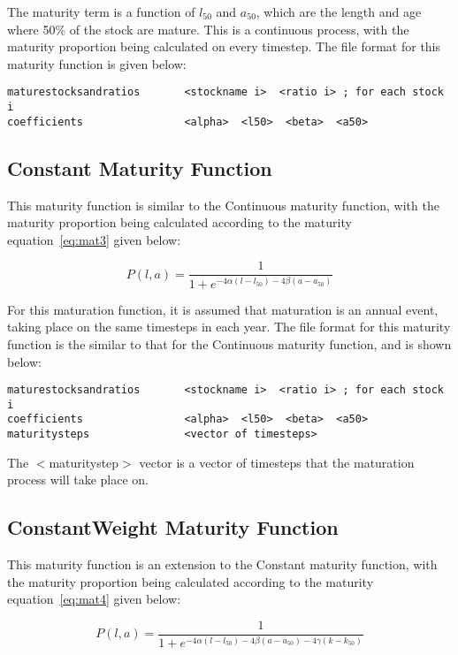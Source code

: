\documentclass[10pt,twoside]{book}
\begin{document}
\bigskip
The maturity term is a function of $l_{50}$ and $a_{50}$, which are the length and age where 50\% of the stock are mature.  This is a continuous process, with the maturity proportion being calculated on every timestep.  The file format for this maturity function is given below:

{\small\begin{verbatim}
maturestocksandratios       <stockname i>  <ratio i> ; for each stock i
coefficients                <alpha>  <l50>  <beta>  <a50>
\end{verbatim}}

\subsection{Constant Maturity Function}
This maturity function is similar to the Continuous maturity function, with the maturity proportion being calculated according to the maturity equation~\ref{eq:mat3} given below:

\begin{equation}\label{eq:mat3}
P(l, a) = \frac{1}{ 1 + e^{-4\alpha(l - l_{50}) -4\beta(a - a_{50})}}
\end{equation}

For this maturation function, it is assumed that maturation is an annual event, taking place on the same timesteps in each year.  The file format for this maturity function is the similar to that for the Continuous maturity function, and is shown below:

{\small\begin{verbatim}
maturestocksandratios       <stockname i>  <ratio i> ; for each stock i
coefficients                <alpha>  <l50>  <beta>  <a50>
maturitysteps               <vector of timesteps>
\end{verbatim}}

The $<$maturitystep$>$ vector is a vector of timesteps that the maturation process will take place on.

\subsection{ConstantWeight Maturity Function}
This maturity function is an extension to the Constant maturity function, with the maturity proportion being calculated according to the maturity equation~\ref{eq:mat4} given below:

\begin{equation}\label{eq:mat4}
P(l, a) = \frac{1}{ 1 + e^{-4\alpha(l - l_{50}) -4\beta(a - a_{50}) -4\gamma(k - k_{50})}}
\end{equation}
\end{document}
